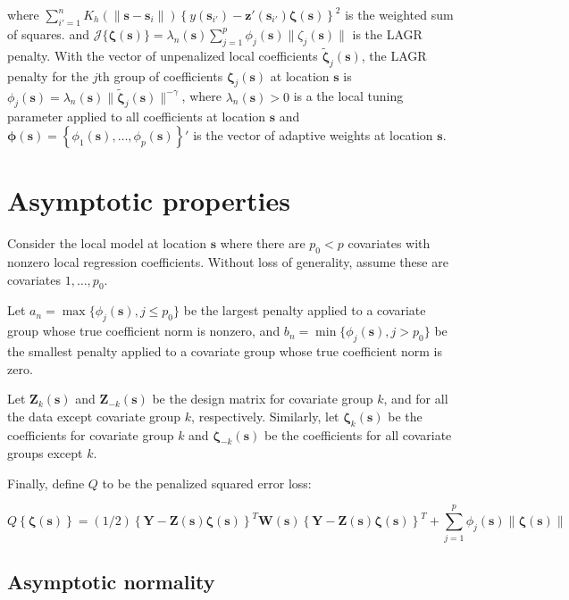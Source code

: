 \documentclass[authoryear, review, 11pt]{elsarticle}
\begin{document}
	where $\sum_{i'=1}^n K_h( \| \bm{s} - \bm{s}_i \| ) \left\{ y(\bm{s}_{i'}) - \bm{z}'(\bm{s}_{i'}) \bm{\zeta}(\bm{s}) \right\}^2$ is the weighted sum of squares. and $\mathcal{J}\{ \bm{\zeta}(\bm{s}) \} = \lambda_n (\bm{s}) \sum_{j=1}^p \phi_j(\bm{s}) \| \zeta_j(\bm{s}) \|$ is the LAGR penalty. With the vector of unpenalized local coefficients $\tilde{\bm{\zeta}}_j (\bm{s})$, the LAGR penalty for the $j$th group of coefficients $\bm{\zeta}_j(\bm{s})$ at location $\bm{s}$ is $\phi_j(\bm{s}) = \lambda_n (\bm{s}) \| \tilde{\bm{\zeta}}_j(\bm{s}) \|^{-\gamma}$, where $\lambda_n (\bm{s}) > 0$ is a the local tuning parameter applied to all coefficients at location $\bm{s}$ and $\bm{\phi} (\bm{s}) = \left\{ \phi_1 (\bm{s}), \dots, \phi_p (\bm{s}) \right\}'$ is the vector of adaptive weights at location $\bm{s}$.


    \section{Asymptotic properties}
        Consider the local model at location $\bm{s}$ where there are $p_0 < p$ covariates with nonzero local regression coefficients. Without loss of generality, assume these are covariates $1, \dots, p_0$.
        
        Let $a_n = \max \{ \phi_j(\bm{s}), j \le p_0 \}$ be the largest penalty applied to a covariate group whose true coefficient norm is nonzero, and $b_n = \min \{ \phi_j(\bm{s}), j > p_0 \}$ be the smallest penalty applied to a covariate group whose true coefficient norm is zero.
        
        Let $\bm{Z}_k(\bm{s})$ and $\bm{Z}_{-k}(\bm{s})$ be the design matrix for covariate group $k$, and for all the data except covariate group $k$, respectively. Similarly, let $\bm{\zeta}_k(\bm{s})$ be the coefficients for covariate group $k$ and $\bm{\zeta}_{-k}(\bm{s})$ be the coefficients for all covariate groups except $k$.

        Finally, define $Q$ to be the penalized squared error loss:

        \begin{equation*}
            Q \left\{ \bm{\zeta} (\bm{s}) \right\} = (1/2) \left\{ \bm{Y} - \bm{Z}(\bm{s}) \bm{\zeta} (\bm{s}) \right\}^T \bm{W}(\bm{s}) \left\{ \bm{Y} - \bm{Z}(\bm{s}) \bm{\zeta} (\bm{s}) \right\}^T + \sum_{j=1}^p \phi_j(\bm{s}) \| \bm{\zeta}(\bm{s}) \|
        \end{equation*}

        \subsection{Asymptotic normality}
    
\end{document}
